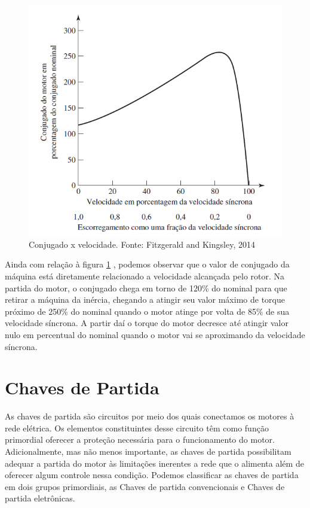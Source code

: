 \documentclass[a4paper, 12pt,oneside, english, brazil]{abntex2}
\begin{document}
\begin{figure}[H]
    \centering
    \includegraphics[scale=0.42]{tor.png}
    \caption{Conjugado x velocidade. Fonte: Fitzgerald and Kingsley, 2014}
    \label{tor}
\end{figure}
Ainda com relação à figura \ref{tor} , podemos observar que o valor de conjugado da máquina está diretamente relacionado a velocidade alcançada pelo rotor. Na partida do motor, o conjugado chega em torno de 120$\%$ do nominal para que retirar a máquina da inércia, chegando a atingir seu valor máximo de torque próximo de 250$\%$ do nominal quando o motor atinge por volta de 85$\%$ de sua velocidade síncrona. A partir daí o torque do motor decresce até atingir valor nulo em percentual do nominal quando o motor vai se aproximando da velocidade síncrona.

\section{Chaves de Partida}
As chaves de partida são circuitos por meio dos quais conectamos os motores à rede elétrica. Os elementos constituintes desse circuito têm como função primordial oferecer a proteção necessária para o funcionamento do motor. Adicionalmente, mas não menos importante, as chaves de partida possibilitam adequar a partida do motor às limitações inerentes a rede que o alimenta além de oferecer algum controle nessa condição. Podemos classificar as chaves de partida em dois grupos primordiais, as Chaves de partida convencionais e Chaves de partida eletrônicas.
\end{document}
